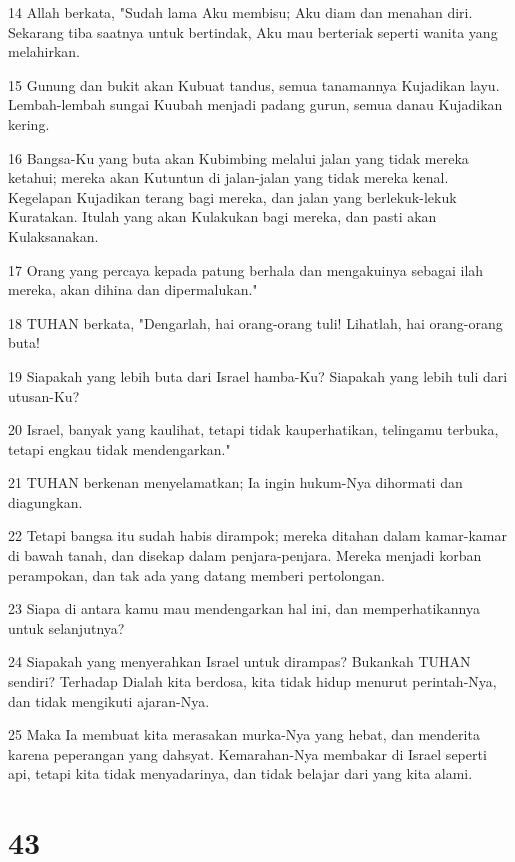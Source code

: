 \par 14 Allah berkata, "Sudah lama Aku membisu; Aku diam dan menahan diri. Sekarang tiba saatnya untuk bertindak, Aku mau berteriak seperti wanita yang melahirkan.
\par 15 Gunung dan bukit akan Kubuat tandus, semua tanamannya Kujadikan layu. Lembah-lembah sungai Kuubah menjadi padang gurun, semua danau Kujadikan kering.
\par 16 Bangsa-Ku yang buta akan Kubimbing melalui jalan yang tidak mereka ketahui; mereka akan Kutuntun di jalan-jalan yang tidak mereka kenal. Kegelapan Kujadikan terang bagi mereka, dan jalan yang berlekuk-lekuk Kuratakan. Itulah yang akan Kulakukan bagi mereka, dan pasti akan Kulaksanakan.
\par 17 Orang yang percaya kepada patung berhala dan mengakuinya sebagai ilah mereka, akan dihina dan dipermalukan."
\par 18 TUHAN berkata, "Dengarlah, hai orang-orang tuli! Lihatlah, hai orang-orang buta!
\par 19 Siapakah yang lebih buta dari Israel hamba-Ku? Siapakah yang lebih tuli dari utusan-Ku?
\par 20 Israel, banyak yang kaulihat, tetapi tidak kauperhatikan, telingamu terbuka, tetapi engkau tidak mendengarkan."
\par 21 TUHAN berkenan menyelamatkan; Ia ingin hukum-Nya dihormati dan diagungkan.
\par 22 Tetapi bangsa itu sudah habis dirampok; mereka ditahan dalam kamar-kamar di bawah tanah, dan disekap dalam penjara-penjara. Mereka menjadi korban perampokan, dan tak ada yang datang memberi pertolongan.
\par 23 Siapa di antara kamu mau mendengarkan hal ini, dan memperhatikannya untuk selanjutnya?
\par 24 Siapakah yang menyerahkan Israel untuk dirampas? Bukankah TUHAN sendiri? Terhadap Dialah kita berdosa, kita tidak hidup menurut perintah-Nya, dan tidak mengikuti ajaran-Nya.
\par 25 Maka Ia membuat kita merasakan murka-Nya yang hebat, dan menderita karena peperangan yang dahsyat. Kemarahan-Nya membakar di Israel seperti api, tetapi kita tidak menyadarinya, dan tidak belajar dari yang kita alami.

\chapter{43}

